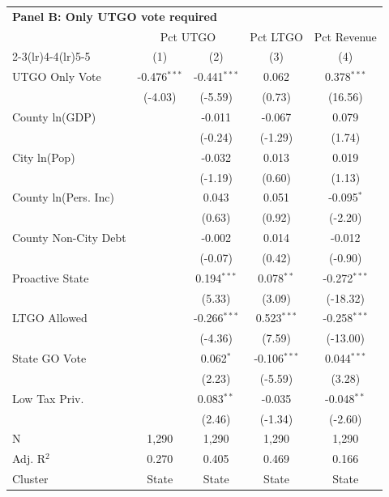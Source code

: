 \begingroup
\centering
\begin{tabular*}{\textwidth}{@{\extracolsep{\fill}}lcccc}
\multicolumn{5}{l}{\textbf{Panel B: Only UTGO vote required}}\\

\addlinespace
   \toprule
    & \multicolumn{2}{c}{Pct UTGO} & Pct LTGO & Pct Revenue\\
   \cmidrule(lr){2-3}\cmidrule(lr){4-4}\cmidrule(lr){5-5}
                        & (1)            & (2)            & (3)            & (4)\\  
   \midrule 
   UTGO Only Vote       & -0.476$^{***}$ & -0.441$^{***}$ & 0.062          & 0.378$^{***}$\\   
                        & (-4.03)       & (-5.59)       & (0.73)        & (16.56)\\   
   County ln(GDP)       &                & -0.011         & -0.067         & 0.079\\   
                        &                & (-0.24)       & (-1.29)       & (1.74)\\   
   City ln(Pop)         &                & -0.032         & 0.013          & 0.019\\   
                        &                & (-1.19)       & (0.60)        & (1.13)\\   
   County ln(Pers. Inc) &                & 0.043          & 0.051          & -0.095$^{*}$\\   
                        &                & (0.63)        & (0.92)        & (-2.20)\\   
   County Non-City Debt &                & -0.002         & 0.014          & -0.012\\   
                        &                & (-0.07)       & (0.42)        & (-0.90)\\   
   Proactive State      &                & 0.194$^{***}$  & 0.078$^{**}$   & -0.272$^{***}$\\   
                        &                & (5.33)        & (3.09)        & (-18.32)\\   
   LTGO Allowed         &                & -0.266$^{***}$ & 0.523$^{***}$  & -0.258$^{***}$\\   
                        &                & (-4.36)       & (7.59)        & (-13.00)\\   
   State GO Vote        &                & 0.062$^{*}$    & -0.106$^{***}$ & 0.044$^{***}$\\   
                        &                & (2.23)        & (-5.59)       & (3.28)\\   
   Low Tax Priv.        &                & 0.083$^{**}$   & -0.035         & -0.048$^{**}$\\   
                        &                & (2.46)        & (-1.34)       & (-2.60)\\   
   \hline
   N         & 1,290          & 1,290          & 1,290          & 1,290\\  
   Adj. R$^2$       & 0.270          & 0.405          & 0.469          & 0.166\\  
   Cluster              & State & State & State & State\\  
   \bottomrule
\end{tabular*}
\par\endgroup
